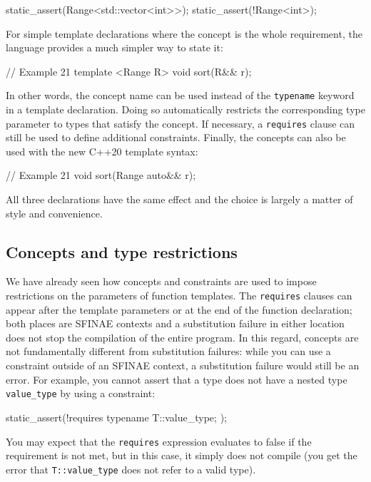 \begin{code}
static_assert(Range<std::vector<int>>);
static_assert(!Range<int>);
\end{code}

For simple template declarations where the concept is the whole requirement, the language provides a much simpler way to state it:

\begin{code}
// Example 21
template <Range R> void sort(R&& r);
\end{code}

In other words, the concept name can be used instead of the \texttt{typename} keyword in a template declaration. Doing so automatically restricts the corresponding type parameter to types that satisfy the concept. If necessary, a \texttt{requires} clause can still be used to define additional constraints. Finally, the concepts can also be used with the new C++20 template syntax:

\begin{code}
// Example 21
void sort(Range auto&& r);
\end{code}

All three declarations have the same effect and the choice is largely a matter of style and convenience.

\subsection{Concepts and type restrictions}

We have already seen how concepts and constraints are used to impose restrictions on the parameters of function templates. The \texttt{requires} clauses can appear after the template parameters or at the end of the function declaration; both places are SFINAE contexts and a substitution failure in either location does not stop the compilation of the entire program. In this regard, concepts are not fundamentally different from substitution failures: while you can use a constraint outside of an SFINAE context, a substitution failure would still be an error. For example, you cannot assert that a type does not have a nested type \texttt{value\_type} by using a constraint:

\begin{code}
static_assert(!requires{ typename T::value_type; });
\end{code}

You may expect that the \texttt{requires} expression evaluates to false if the requirement is not met, but in this case, it simply does not compile (you get the error that \texttt{T::value\_type} does not refer to a valid type).

